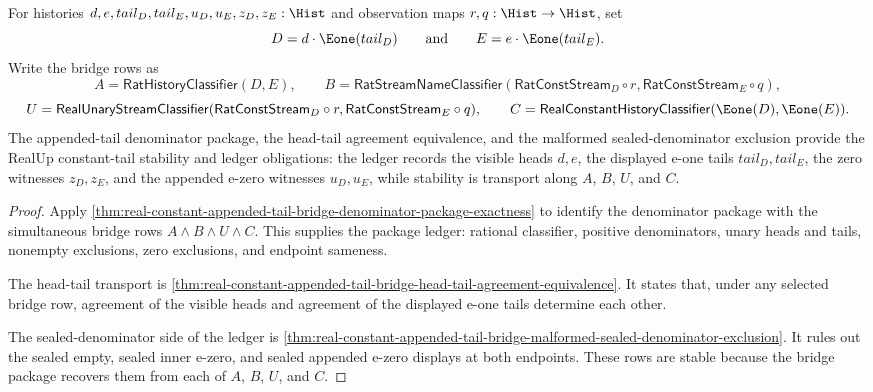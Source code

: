 \begin{theorem}
\label{thm:real-constant-tail-obligation-stability-ledger}
For histories $d,e,tail_D,tail_E,u_D,u_E,z_D,z_E:\Hist$ and observation maps
$r,q:\Hist\to\Hist$, set
$$
D=d\cdot\Eone(tail_D)
\qquad\text{and}\qquad
E=e\cdot\Eone(tail_E).
$$
Write the bridge rows as
$$
A=\mathsf{RatHistoryClassifier}(D,E),
\qquad
B=\mathsf{RatStreamNameClassifier}(\mathsf{RatConstStream}_D\circ r,
\mathsf{RatConstStream}_E\circ q),
$$
$$
U=\mathsf{RealUnaryStreamClassifier}(\mathsf{RatConstStream}_D\circ r,
\mathsf{RatConstStream}_E\circ q),
\qquad
C=\mathsf{RealConstantHistoryClassifier}(\Eone(D),\Eone(E)).
$$
The appended-tail denominator package, the head-tail agreement equivalence,
and the malformed sealed-denominator exclusion provide the RealUp
constant-tail stability and ledger obligations: the ledger records the visible
heads $d,e$, the displayed e-one tails $tail_D,tail_E$, the zero witnesses
$z_D,z_E$, and the appended e-zero witnesses $u_D,u_E$, while stability is
transport along $A$, $B$, $U$, and $C$.
\end{theorem}
\begin{proof}
Apply
\autoref{thm:real-constant-appended-tail-bridge-denominator-package-exactness}
to identify the denominator package with the simultaneous bridge rows
$A\land B\land U\land C$. This supplies the package ledger: rational
classifier, positive denominators, unary heads and tails, nonempty exclusions,
zero exclusions, and endpoint sameness.

The head-tail transport is
\autoref{thm:real-constant-appended-tail-bridge-head-tail-agreement-equivalence}.
It states that, under any selected bridge row, agreement of the visible heads
and agreement of the displayed e-one tails determine each other.

The sealed-denominator side of the ledger is
\autoref{thm:real-constant-appended-tail-bridge-malformed-sealed-denominator-exclusion}.
It rules out the sealed empty, sealed inner e-zero, and sealed appended
e-zero displays at both endpoints. These rows are stable because the bridge
package recovers them from each of $A$, $B$, $U$, and $C$.
\end{proof}

